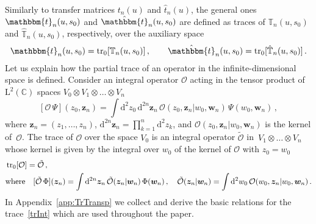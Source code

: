 \documentclass[a4paper,11pt]{article}
\newcommand{\tr}{\mathop{\rm tr}\nolimits}
\numberwithin{equation}{section}
\begin{document}
Similarly to transfer matrices $t_n(u)$ and $\hat{t}_n(u)$, the general ones $\mathbbm{t}_n(u,s_0)$ and $\hat{\mathbbm{t}}_n(u,s_0)$ are defined as traces of $\mathbb{T}_n(u,s_0)$ and $\hat{\mathbb{T}}_n(u,s_0)$, respectively, over the auxiliary space
\begin{align} \label{general-t}
	\mathbbm{t}_n(u,s_0) = \tr_0[\mathbb{T}_n(u,s_0)] \,, \qquad
	\hat{\mathbbm{t}}_n(u,s_0) = \tr_0[\hat{\mathbb{T}}_n(u,s_0)] \,.
\end{align}
Let us explain how the partial trace of an operator in the infinite-dimensional space is defined.
Consider an integral operator $\mathcal{O}$ acting in the tensor product of $\mathrm{L}^2(\mathbb{C})$ spaces $V_0\otimes V_1\otimes\dots\otimes V_n$
\begin{equation} \nonumber
	[\mathcal{O}\,\Psi](z_0,\bm{z}_n) = \int \mathrm{d}^2z_0\,\mathrm{d}^{2n}\bm{z}_n \,
	\mathcal{O}(z_0,\bm{z}_n|w_0,\bm{w}_n) \,
	\Psi(w_0,\bm{w}_n) \,,
\end{equation}
where $\bm{z}_n = (z_1,\dots,z_n)$, $\mathrm{d}^{2n}\bm{z}_n = \prod_{k=1}^n \mathrm{d}^2z_k$, and $\mathcal{O}(z_0,\bm{z}_n|w_0,\bm{w}_n)$ is the kernel of~$\mathcal{O}$.
The trace of $\mathcal{O}$ over the space $V_0$ is an integral operator $\tilde{\mathcal{O}}$ in~$V_1\otimes\dots\otimes V_n$ whose kernel is given by the integral over $w_0$ of the kernel of $\mathcal{O}$ with $z_0=w_0$
\begin{align}
	& \label{trInt}
	\tr_0[\mathcal{O}] = \tilde{\mathcal{O}} \,, \\
	& \nonumber
	\text{where} \quad
	[\tilde{\mathcal{O}}\,\Phi](\bm{z}_n) =
	\int \mathrm{d}^{2n}\bm{z}_n \, \tilde{\mathcal{O}}(\bm{z}_n|\bm{w}_n)\,\Phi(\bm{w}_n) \,, \quad
	\tilde{\mathcal{O}}(\bm{z}_n|\bm{w}_n) = \int \mathrm{d}^2w_0\,\mathcal{O}(w_0,\bm{z}_n|w_0,\bm{w}_n) \,.
\end{align}
In Appendix~\ref{app:TrTransp} we collect and derive the basic relations for the trace~\eqref{trInt} which are used throughout the paper.
\end{document}
